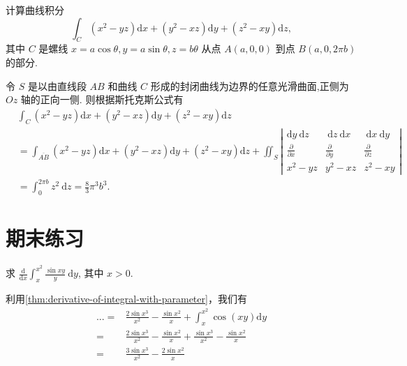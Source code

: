 \begin{example}
    计算曲线积分
$$
\int_C\left(x^2-y z\right) \mathrm{d} x+\left(y^2-x z\right) \mathrm{d} y+\left(z^2-x y\right) \mathrm{d} z,
$$
其中 $C$ 是螺线 $x=a \cos \theta, y=a \sin \theta, z=b \theta$ 从点 $A(a, 0,0)$ 到点 $B(a, 0,2 \pi b)$ 的部分.
\end{example}

\begin{solution}
令 $S$ 是以由直线段 $A B$ 和曲线 $C$ 形成的封闭曲线为边界的任意光滑曲面,正侧为 $O z$ 轴的正向一侧. 则根据斯托克斯公式有
$$
\begin{aligned}
& \int_C\left(x^2-y z\right) \mathrm{d} x+\left(y^2-x z\right) \mathrm{d} y+\left(z^2-x y\right) \mathrm{d} z \\
& =\int_{\overline{A B}}\left(x^2-y z\right) \mathrm{d} x+\left(y^2-x z\right) \mathrm{d} y+\left(z^2-x y\right) \mathrm{d} z+\iint_S\left|\begin{array}{ccc}
\mathrm{d} y \mathrm{~d} z & \mathrm{~d} z \mathrm{~d} x & \mathrm{~d} x \mathrm{~d} y \\
\frac{\partial}{\partial x} & \frac{\partial}{\partial y} & \frac{\partial}{\partial z} \\
x^2-y z & y^2-x z & z^2-x y
\end{array}\right| \\
& =\int_0^{2 \pi b} z^2 \mathrm{~d} z=\frac{8}{3} \pi^3 b^3 .
\end{aligned}
$$
\end{solution}

\section{期末练习}

\begin{exercise}
    求 $\frac{\mathrm{d}}{\mathrm{d} x} \int_x^{x^2} \frac{\sin x y}{y} \mathrm{~d} y$, 其中 $x>0$.
\end{exercise}
\begin{solution}
    利用\ref{thm:derivative-of-integral-with-parameter}，我们有
    \begin{align*}
        ...=&\frac{2\sin x^3}{x^2}-\frac{\sin x^2}{x}+\int_x^{x^2}\cos(xy)\mathrm{d}y\\
        =&\frac{2\sin x^3}{x^2}-\frac{\sin x^2}{x}+\frac{\sin x^3}{x^2}-\frac{\sin x^2}{x}\\
        =&\frac{3\sin x^3}{x^2}-\frac{2\sin x^2}{x}
    \end{align*}
\end{solution}

